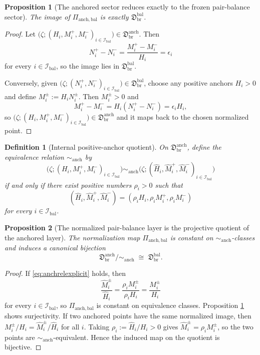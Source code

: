\documentclass[11pt]{article}
\newcommand{\MidBalanceSector}{\mathfrak D_{\mathrm{br}}^{\mathrm{bal}}}
\newcommand{\BalOriginSector}{\mathfrak D_{\mathrm{br}}^{\mathrm{anch}}}
\newcommand{\BalOriginMap}{\Pi_{\mathrm{anch,bal}}}
\newcommand{\AnchProjRel}{\sim_{\mathrm{anch}}}
\newcommand{\BalIndex}{\mathcal I_{\mathrm{bal}}}
\newtheorem{definition}{Definition}
\newtheorem{proposition}{Proposition}
\begin{document}
\begin{proposition}[The anchored sector reduces exactly to the frozen pair-balance sector]
\label{prop:exactimage}
The image of \(\BalOriginMap\) is exactly \(\MidBalanceSector\).
\end{proposition}

\begin{proof}
Let \(\bigl(\zeta;(H_i,M_i^+,M_i^-)_{i\in\BalIndex}\bigr)\in\BalOriginSector\). Then
\[
N_i^+-N_i^-=\frac{M_i^+-M_i^-}{H_i}=\epsilon_i
\]
for every \(i\in\BalIndex\), so the image lies in \(\MidBalanceSector\).

Conversely, given \(\bigl(\zeta;(N_i^+,N_i^-)_{i\in\BalIndex}\bigr)\in\MidBalanceSector\), choose any positive anchors \(H_i>0\) and define \(M_i^\pm:=H_iN_i^\pm\). Then \(M_i^\pm>0\) and
\[
M_i^+-M_i^-=H_i(N_i^+-N_i^-)=\epsilon_i H_i,
\]
so \(\bigl(\zeta;(H_i,M_i^+,M_i^-)_{i\in\BalIndex}\bigr)\in\BalOriginSector\) and it maps back to the chosen normalized point.
\end{proof}

\begin{definition}[Internal positive-anchor quotient]
\label{def:anchquotient}
On \(\BalOriginSector\), define the equivalence relation \(\AnchProjRel\) by
\begin{equation}
\bigl(\zeta;(H_i,M_i^+,M_i^-)_{i\in\BalIndex}\bigr)
\AnchProjRel
\bigl(\zeta;(\widehat H_i,\widehat M_i^+,\widehat M_i^-)_{i\in\BalIndex}\bigr)
\label{eq:anchrel}
\end{equation}
if and only if there exist positive numbers \(\rho_i>0\) such that
\begin{equation}
(\widehat H_i,\widehat M_i^+,\widehat M_i^-)
=
(\rho_i H_i,\rho_i M_i^+,\rho_i M_i^-)
\label{eq:anchrelexplicit}
\end{equation}
for every \(i\in\BalIndex\).
\end{definition}

\begin{proposition}[The normalized pair-balance layer is the projective quotient of the anchored layer]
\label{prop:quotient}
The normalization map \(\BalOriginMap\) is constant on \(\AnchProjRel\)-classes and induces a canonical bijection
\begin{equation}
\BalOriginSector/\AnchProjRel
\;\cong\;
\MidBalanceSector.
\label{eq:anchquotient}
\end{equation}
\end{proposition}

\begin{proof}
If \eqref{eq:anchrelexplicit} holds, then
\[
\frac{\widehat M_i^\pm}{\widehat H_i}
=
\frac{\rho_i M_i^\pm}{\rho_i H_i}
=
\frac{M_i^\pm}{H_i}
\]
for every \(i\in\BalIndex\), so \(\BalOriginMap\) is constant on equivalence classes. Proposition \ref{prop:exactimage} shows surjectivity. If two anchored points have the same normalized image, then \(M_i^\pm/H_i=\widehat M_i^\pm/\widehat H_i\) for all \(i\). Taking \(\rho_i:=\widehat H_i/H_i>0\) gives \(\widehat M_i^\pm=\rho_i M_i^\pm\), so the two points are \(\AnchProjRel\)-equivalent. Hence the induced map on the quotient is bijective.
\end{proof}
\end{document}
